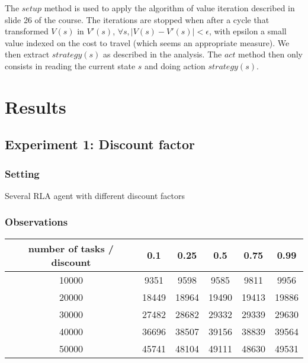 \documentclass[11pt]{article}
\begin{document}
The $setup$ method is used to apply the algorithm of value iteration described in slide 26 of the course. The iterations are stopped when after a cycle that transformed $V(s)$ in $V'(s)$, $\forall s, |V(s)-V'(s)|<\epsilon$, with epsilon a small value indexed on the cost to travel (which seems an appropriate measure). We then extract $strategy(s)$ as described in the analysis.
\newline
The $act$ method then only consists in reading the current state $s$ and doing action $strategy(s)$.
\section{Results}

\subsection{Experiment 1: Discount factor}

\subsubsection{Setting}
Several RLA agent with different discount factors

\subsubsection{Observations}

\begin{tabular}{|c|c|c|c|c|c|}
\hline 
number of tasks / discount & 0.1 & 0.25 & 0.5 & 0.75 & 0.99 \\ 
\hline 
10000 & 9351 & 9598 & 9585 & 9811 & 9956 \\ 
\hline 
20000 & 18449 & 18964 & 19490 & 19413 & 19886 \\ 
\hline 
30000 & 27482 & 28682 & 29332 & 29339 & 29630 \\ 
\hline 
40000 & 36696 & 38507 & 39156 & 38839 & 39564 \\ 
\hline 
50000 & 45741 & 48104 & 49111 & 48630 & 49531 \\ 
\hline 
\end{tabular} 
\end{document}
